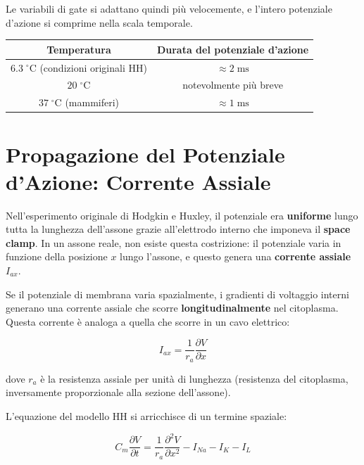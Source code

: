 Le variabili di gate si adattano quindi più velocemente, e l'intero potenziale d'azione si comprime nella scala temporale.

\begin{table}[htbp]
    \centering
    \renewcommand{\arraystretch}{1.3}
    \begin{tabular}{|c|c|}
    \hline
    \textbf{Temperatura} & \textbf{Durata del potenziale d'azione} \\
    \hline
    $6.3 \; ^\circ\text{C}$ (condizioni originali HH) & $\approx 2 \; \text{ms}$ \\
    \hline
    $20 \; ^\circ\text{C}$ & notevolmente più breve \\
    \hline
    $37 \; ^\circ\text{C}$ (mammiferi) & $\approx 1 \; \text{ms}$ \\
    \hline
    \end{tabular}
\end{table}

\section{Propagazione del Potenziale d'Azione: Corrente Assiale}

Nell'esperimento originale di Hodgkin e Huxley, il potenziale era \textbf{uniforme} lungo tutta la lunghezza dell'assone grazie all'elettrodo interno che imponeva il \textbf{space clamp}. In un assone reale, non esiste questa costrizione: il potenziale varia in funzione della posizione $x$ lungo l'assone, e questo genera una \textbf{corrente assiale} $I_{ax}$.


Se il potenziale di membrana varia spazialmente, i gradienti di voltaggio interni generano una corrente assiale che scorre \textbf{longitudinalmente} nel citoplasma. Questa corrente è analoga a quella che scorre in un cavo elettrico:

\begin{equation}
I_{ax} = \frac{1}{r_a} \frac{\partial V}{\partial x}
\end{equation}

dove $r_a$ è la resistenza assiale per unità di lunghezza (resistenza del citoplasma, inversamente proporzionale alla sezione dell'assone).

L'equazione del modello HH si arricchisce di un termine spaziale:

\begin{equation}
C_m \frac{\partial V}{\partial t} = \frac{1}{r_a} \frac{\partial^2 V}{\partial x^2} - I_{Na} - I_K - I_L
\end{equation}




